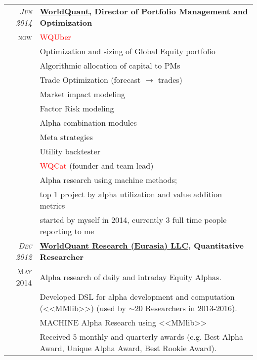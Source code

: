 \documentclass[unicode,a4paper,10pt]{article}
\begin{document}
\begin{tabular}{r p{13cm}}
 \emph{\textsc{Jun 2014}} & \textbf{\href{https://www.worldquant.com/}{WorldQuant}, Director of Portfolio Management and Optimization} \\
\textsc{now}
&\footnotesize{\textcolor{red}{WQUber}} \\
&\footnotesize{\hspace{0.5cm} Optimization and sizing of Global Equity portfolio}\\
&\footnotesize{\hspace{0.5cm} Algorithmic allocation of capital to PMs}\\
&\footnotesize{\hspace{0.5cm} Trade Optimization (forecast $\to$ trades)}\\
&\footnotesize{\hspace{0.5cm} Market impact modeling}\\
&\footnotesize{\hspace{0.5cm} Factor Risk modeling}\\
&\footnotesize{\hspace{0.5cm} Alpha combination modules}\\
&\footnotesize{\hspace{0.5cm} Meta strategies}\\
&\footnotesize{\hspace{0.5cm} Utility backtester}\\
&\footnotesize{\textcolor{red}{WQCat}} (founder and team lead)\\
&\footnotesize{\hspace{0.5cm} Alpha research using machine methods;} \\
&\footnotesize{\hspace{0.5cm} top 1 project by alpha utilization and value addition metrics}\\
&\footnotesize{\hspace{0.5cm} started by myself in 2014, currently 3 full time people reporting to me}\\
\emph{\textsc{Dec 2012}} & \textbf{\href{https://www.worldquant.com/}{WorldQuant Research (Eurasia) LLC}, Quantitative Researcher} \\
\textsc{May 2014}
&\footnotesize{Alpha research of daily and intraday Equity Alphas.}\\
&\footnotesize{Developed DSL for alpha development and computation (<<MMlib>>) (used by $\sim$20 Researchers in 2013-2016).}\\
&\footnotesize{MACHINE Alpha Research using <<MMlib>>}\\
&\footnotesize{Received 5 monthly and quarterly awards (e.g. Best Alpha Award, Unique Alpha Award, Best Rookie Award).}\\



\end{tabular}
\end{document}
